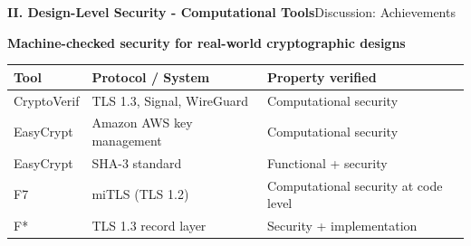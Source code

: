 \documentclass[10pt,aspectratio=1610,compress,dvipsnames]{beamer}
\begin{document}
\begin{frame}[fragile]{\bfseries II. Design-Level Security - Computational Tools}{Discussion: Achievements}
\begin{description}[style=nextline]
	\item[{\color{cseblue}\bfseries Achievements}] \textbf{Machine-checked security for real-world cryptographic designs}
\end{description}
\begin{table}[h]\footnotesize\renewcommand{\arraystretch}{1.3}
\begin{tabular}{l|l|l}
\toprule[1.2pt]
\textbf{Tool} & \textbf{Protocol / System} & \textbf{Property verified} \\
\midrule
CryptoVerif & TLS 1.3, Signal, WireGuard & Computational security \\
EasyCrypt   & Amazon AWS key management & Computational security \\
EasyCrypt   & SHA-3 standard & Functional + security \\
F7          & miTLS (TLS 1.2) & Computational security at code level \\
F*          & TLS 1.3 record layer & Security + implementation \\
\bottomrule[1.2pt]
\end{tabular}
\end{table}
\end{frame}
\end{document}
